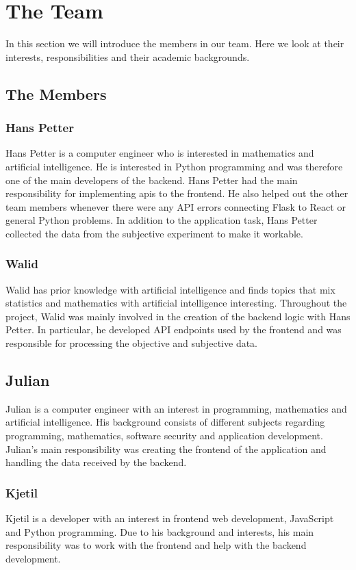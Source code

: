 \section{The Team}
In this section we will introduce the members in our team. Here we look at their interests, responsibilities and their academic backgrounds. 

\subsection{The Members}

\subsubsection*{Hans Petter}
Hans Petter is a computer engineer who is interested in mathematics and artificial intelligence. He is interested in Python programming and was therefore one of the main developers of the backend. Hans Petter had the main responsibility for implementing \acrshort{api}s to the frontend. He also helped out the other team members whenever there were any API errors connecting Flask to React or general Python problems. In addition to the application task, Hans Petter collected the data from the subjective experiment to make it workable. 

\subsubsection*{Walid}
Walid has prior knowledge with artificial intelligence and finds topics that mix statistics and mathematics with artificial intelligence interesting. Throughout the project, Walid was mainly involved in the creation of the backend logic with Hans Petter. In particular, he developed API endpoints used by the frontend and was responsible for processing the objective and subjective data.   

\subsection*{Julian}
Julian is a computer engineer with an interest in programming, mathematics and artificial intelligence. His background consists of different subjects regarding programming, mathematics, software security and application development. Julian's main responsibility was creating the frontend of the application and handling the data received by the backend. 

\subsubsection*{Kjetil}
Kjetil is a developer with an interest in frontend web development, JavaScript and Python programming. Due to his background and interests, his main responsibility was to work with the frontend and help with the backend development. 


